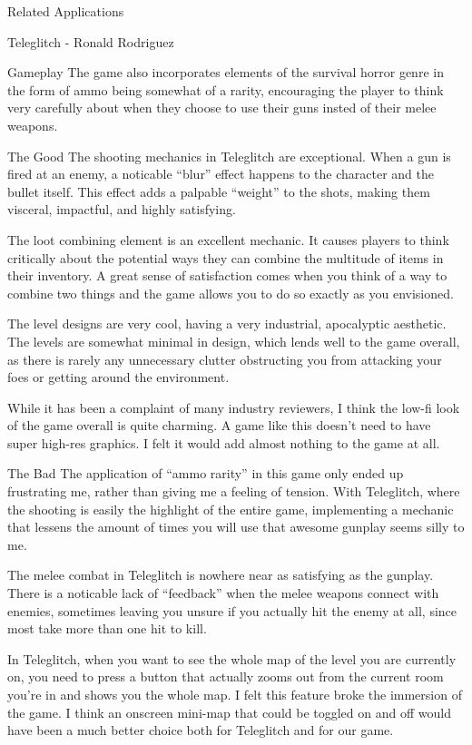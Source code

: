 \documentclass[12pt]{report}
\begin{document}
\begin{section}{Related Applications}
\begin{subsection}{Teleglitch - Ronald Rodriguez}
\begin{subsubsection}{Gameplay}
The game also incorporates elements of the survival horror genre in the
form of ammo being somewhat of a rarity, encouraging the player to think
very carefully about when they choose to use their guns insted of their
melee weapons.
\end{subsubsection}

\begin{subsubsection}{The Good}
The shooting mechanics in Teleglitch are exceptional. When a gun is fired
at an enemy, a noticable ``blur'' effect happens to the character and the
bullet itself. This effect adds a palpable ``weight'' to the shots, making
them visceral, impactful, and highly satisfying. 

The loot combining element is an excellent mechanic. It causes players to
think critically about the potential ways they can combine the multitude of
items in their inventory. A great sense of satisfaction comes when you
think of a way to combine two things and the game allows you to do so
exactly as you envisioned. 

The level designs are very cool, having a very industrial, apocalyptic
aesthetic. The levels are somewhat minimal in design, which lends well to
the game overall, as there is rarely any unnecessary clutter obstructing
you from attacking your foes or getting around the environment. 

While it has been a complaint of many industry reviewers, I think the
low-fi look of the game overall is quite charming. A game like this doesn't
need to have super high-res graphics. I felt it would add almost nothing to
the game at all. 
\end{subsubsection}

\begin{subsubsection}{The Bad}
The application of ``ammo rarity'' in this game only ended up frustrating
me, rather than giving me a feeling of tension. With Teleglitch, where the
shooting is easily the highlight of the entire game, implementing a
mechanic that lessens the amount of times you will use that awesome gunplay
seems silly to me. 

The melee combat in Teleglitch is nowhere near as satisfying as the
gunplay. There is a noticable lack of ``feedback'' when the melee weapons
connect with enemies, sometimes leaving you unsure if you actually hit the
enemy at all, since most take more than one hit to kill.  

In Teleglitch, when you want to see the whole map of the level you are
currently on, you need to press a button that actually zooms out from the
current room you're in and shows you the whole map. I felt this feature
broke the immersion of the game. I think an onscreen mini-map that 
could be toggled on and off would have been a much better choice both for
Teleglitch and for our game.
\end{subsubsection}


\end{subsection}
\end{section}
\end{document}
